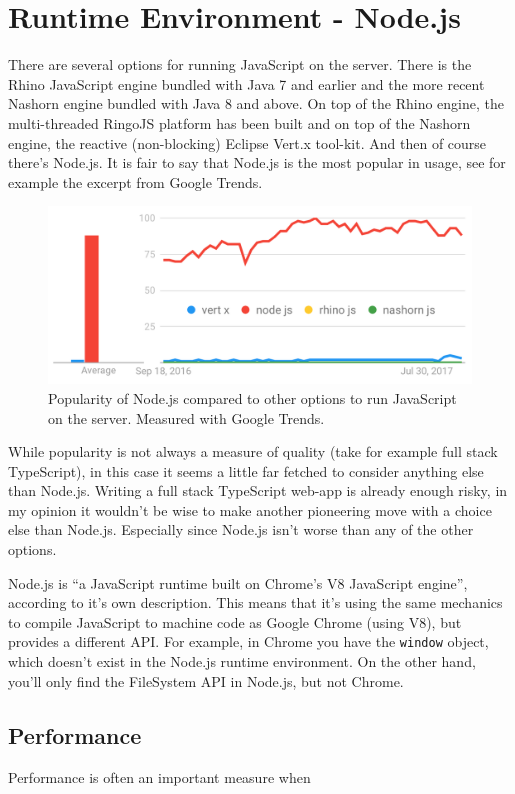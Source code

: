 \documentclass[12pt,a4paper]{report}
\begin{document}
\section{Runtime Environment - Node.js}
There are several options for running JavaScript on the server. There is the Rhino JavaScript engine bundled with Java 7 and earlier and the more recent Nashorn engine bundled with Java 8 and above. On top of the Rhino engine, the multi-threaded RingoJS platform has been built and on top of the Nashorn engine, the reactive (non-blocking) Eclipse Vert.x tool-kit. And then of course there's Node.js. It is fair to say that Node.js is the most popular in usage, see for example the excerpt from Google Trends.
\begin{figure}
\centering
\includegraphics[scale=0.35]{figures/node-vs-other}
\caption{Popularity of Node.js compared to other options to run JavaScript on the server. Measured with Google Trends.}
\end{figure}
While popularity is not always a measure of quality (take for example full stack TypeScript), in this case it seems a little far fetched to consider anything else than Node.js. Writing a full stack TypeScript web-app is already enough risky, in my opinion it wouldn't be wise to make another pioneering move with a choice else than Node.js. Especially since Node.js isn't worse than any of the other options.

Node.js is ``a JavaScript runtime built on Chrome's V8 JavaScript engine'', according to it's own description. This means that it's using the same mechanics to compile JavaScript to machine code as Google Chrome (using V8), but provides a different API. For example, in Chrome you have the \texttt{window} object, which doesn't exist in the Node.js runtime environment. On the other hand, you'll only find the FileSystem API in Node.js, but not Chrome.


\subsection{Performance}
Performance is often an important measure when
\end{document}
